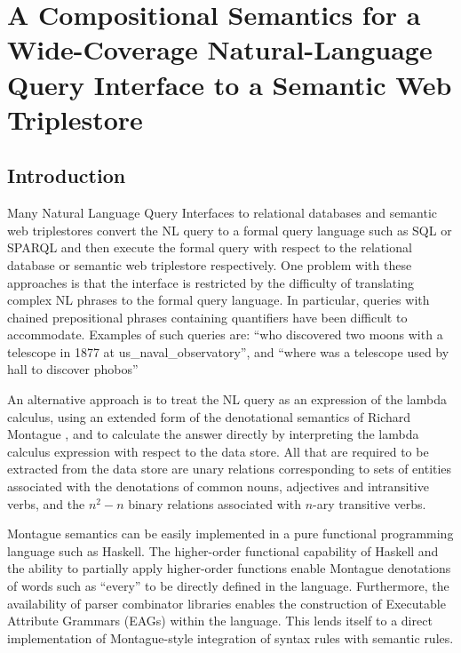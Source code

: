 \documentclass[../main.tex]{subfiles}
\begin{document}
\chapter{A Compositional Semantics for a Wide-Coverage Natural-Language Query Interface to a Semantic Web Triplestore}
\begin{refsection}

\label{chapter:icsc2020conference}


\section{Introduction}

Many Natural Language Query Interfaces to relational databases and semantic web triplestores
convert the NL query to a formal query language such as SQL or SPARQL and then execute the formal
query with respect to the relational database or semantic web triplestore respectively. One problem with
these approaches is that the interface is restricted by the difficulty of translating complex NL phrases to
the formal query language. In particular, queries with chained prepositional phrases containing
quantifiers have been difficult to accommodate. Examples of such queries are: ``who discovered two
moons with a telescope in 1877 at us\_naval\_observatory'', and ``where was a telescope used by hall to discover phobos''

An alternative approach is to treat the NL query as an expression of the lambda calculus, using an
extended form of the denotational semantics of Richard Montague \cite{Dowty:wall}, and to calculate the answer directly
by interpreting the lambda calculus expression with respect to the data store. All that are required to be
extracted from the data store are unary relations corresponding to sets of entities associated with the
denotations of common nouns, adjectives and intransitive verbs, and the $n^2 - n$ binary relations
associated with $n$-ary transitive verbs.

Montague semantics can be easily implemented in a pure functional programming language such as
Haskell. The higher-order functional capability of Haskell and the ability to partially apply higher-order functions enable Montague denotations of words such as ``every'' to be directly defined in the language. Furthermore, the availability of
parser combinator libraries enables the construction of Executable Attribute Grammars (EAGs) within the language.
This lends itself to a direct implementation of Montague-style integration of syntax rules with semantic rules.


\end{refsection}
\end{document}
